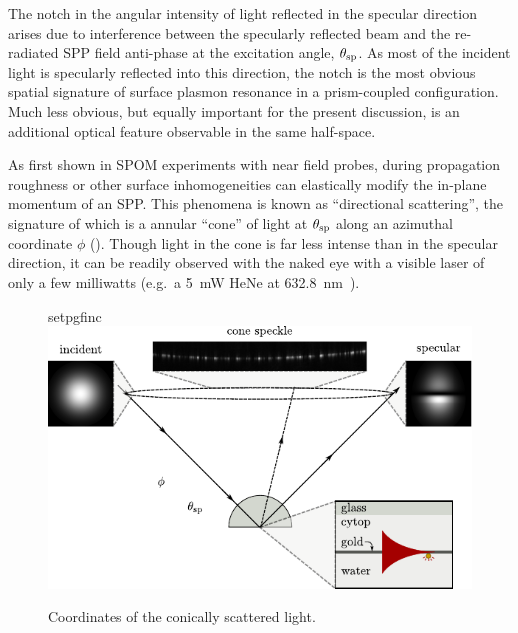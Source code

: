The notch in the angular intensity of light reflected in the specular
direction arises due to interference between the specularly reflected beam
and the re-radiated SPP field anti-phase at the excitation angle,
$\theta_\mathrm{sp}$.  As most of the incident light is specularly reflected into
this direction, the notch is the most obvious spatial signature of surface
plasmon resonance in a prism-coupled configuration.  Much less obvious, but
equally important for the present discussion, is an additional optical
feature observable in the same half-space.

As first shown in SPOM experiments with near field probes, during propagation
roughness or other surface inhomogeneities can elastically modify the
in-plane momentum of an SPP\@.  This phenomena is known as ``directional
scattering'', the signature of which is a annular ``cone'' of light at
$\theta_\mathrm{sp}$ along an azimuthal coordinate $\phi$ ().
Though light in the cone is far less intense than in the specular
direction, it can be readily observed with the naked eye with a visible
laser of only a few milliwatts (e.g.\ a \SI{5}{\milli\watt} HeNe at
\SI{632.8}{\nano\meter}~\cite{schumann2009surface}).
\begin{figure}[ht]
  \centering
  {setpgfinc}
  \includegraphics{existence/figures/conefig}
  \caption{Coordinates of the conically scattered light.}
\label{fig:conefig}
\end{figure}


